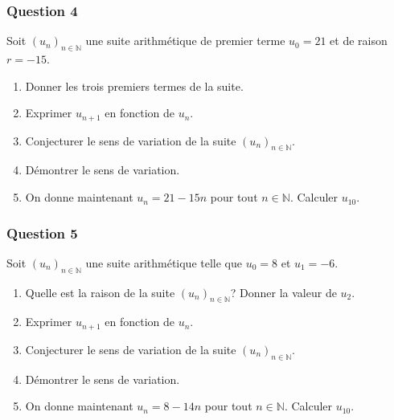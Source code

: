\documentclass[15pt, mathserif]{beamer}
\newcommand{\N}{\mathbb{N}}			%
\newcommand{\st}[1]{$(#1_n)_{n \in \N}$}
\begin{document}
\begin{frame} 
	\frametitle{Question 4}
Soit \st{u} une suite arithmétique de premier terme $u_0=21$ et de raison $r=-15$. 
 
 \begin{enumerate} 
 	 \item Donner les trois premiers termes de la suite. 
 	 \item Exprimer $u_{n+1}$ en fonction de $u_n$. 
 	 \item Conjecturer le sens de variation de la suite \st{u}. 
 	 \item Démontrer le sens de variation. 
 	 \item On donne maintenant $u_n=21-15n$ pour tout $n \in \N$. Calculer $u_{10}$. 
 
 \end{enumerate} \end{frame}


\begin{frame} 
	\frametitle{Question 5}
Soit \st{u} une suite arithmétique telle que $u_0=8$ et $u_1=-6$. 
 
 \begin{enumerate} 
 	 \item Quelle est la raison de la suite \st{u}? Donner la valeur de $u_2$. 
 	 \item Exprimer $u_{n+1}$ en fonction de $u_n$. 
 	 \item Conjecturer le sens de variation de la suite \st{u}. 
 	 \item Démontrer le sens de variation. 
 	 \item On donne maintenant $u_n=8-14n$ pour tout $n \in \N$. Calculer $u_{10}$. 
 
 \end{enumerate} \end{frame}
\end{document}
